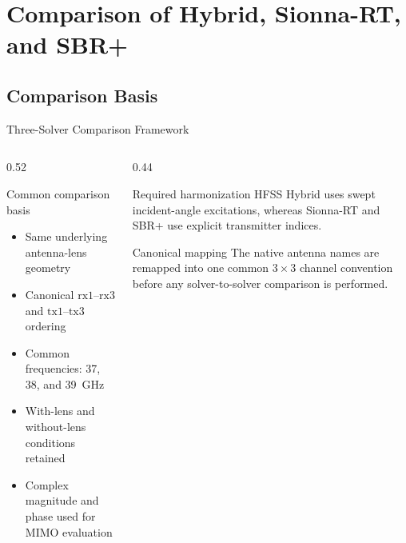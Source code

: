 
\section{Comparison of Hybrid, Sionna-RT, and SBR+}

\subsection{Comparison Basis}

\begin{frame}[t,shrink=8]{Three-Solver Comparison Framework}
    \begin{columns}[T,onlytextwidth]
        \begin{column}{0.52\textwidth}
            \begin{block}{Common comparison basis}
                \begin{itemize}
                    \item Same underlying antenna-lens geometry
                    \item Canonical $\mathrm{rx}1$--$\mathrm{rx}3$ and
                    $\mathrm{tx}1$--$\mathrm{tx}3$ ordering
                    \item Common frequencies: 37, 38, and 39~GHz
                    \item With-lens and without-lens conditions retained
                    \item Complex magnitude and phase used for MIMO evaluation
                \end{itemize}
            \end{block}
        \end{column}
        \begin{column}{0.44\textwidth}
            \begin{alertblock}{Required harmonization}
                HFSS Hybrid uses swept incident-angle excitations, whereas
                Sionna-RT and SBR+ use explicit transmitter indices.
            \end{alertblock}
            \begin{exampleblock}{Canonical mapping}
                The native antenna names are remapped into one common
                $3\times3$ channel convention before any solver-to-solver
                comparison is performed.
            \end{exampleblock}
        \end{column}
    \end{columns}
\end{frame}

